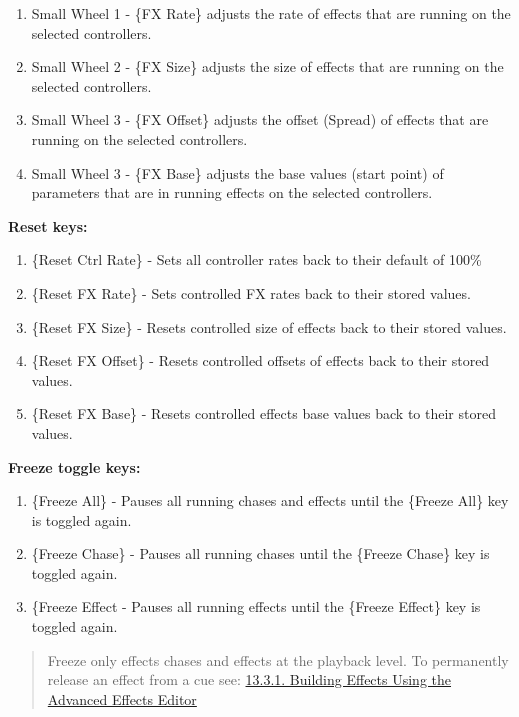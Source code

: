 \documentclass[
]{article}
\begin{document}
\begin{enumerate}
\def\labelenumi{\arabic{enumi}.}
\item
  Small Wheel 1 - \{FX Rate\} adjusts the rate of effects that are running on the selected controllers.
\item
  Small Wheel 2 - \{FX Size\} adjusts the size of effects that are running on the selected controllers.
\item
  Small Wheel 3 - \{FX Offset\} adjusts the offset (Spread) of effects that are running on the selected controllers.
\item
  Small Wheel 3 - \{FX Base\} adjusts the base values (start point) of parameters that are in running effects on the selected controllers.
\end{enumerate}

\textbf{Reset keys:}

\begin{enumerate}
\def\labelenumi{\arabic{enumi}.}
\item
  \{Reset Ctrl Rate\} - Sets all controller rates back to their default of 100\%
\item
  \{Reset FX Rate\} - Sets controlled FX rates back to their stored values.
\item
  \{Reset FX Size\} - Resets controlled size of effects back to their stored values.
\item
  \{Reset FX Offset\} - Resets controlled offsets of effects back to their stored values.
\item
  \{Reset FX Base\} - Resets controlled effects base values back to their stored values.
\end{enumerate}

\textbf{Freeze toggle keys:}

\begin{enumerate}
\def\labelenumi{\arabic{enumi}.}
\item
  \{Freeze All\} - Pauses all running chases and effects until the \{Freeze All\} key is toggled again.
\item
  \{Freeze Chase\} - Pauses all running chases until the \{Freeze Chase\} key is toggled again.
\item
  \{Freeze Effect - Pauses all running effects until the \{Freeze Effect\} key is toggled again.
\end{enumerate}

\begin{quote}
Freeze only effects chases and effects at the playback level. To permanently release an effect from a cue see: \href{https://vibemanual.compulite.com/effects-1.html\#build-a-basic-effect-in-the-advanced-effects-editor}{13.3.1. Building Effects Using the Advanced Effects Editor}
\end{quote}
\end{document}
